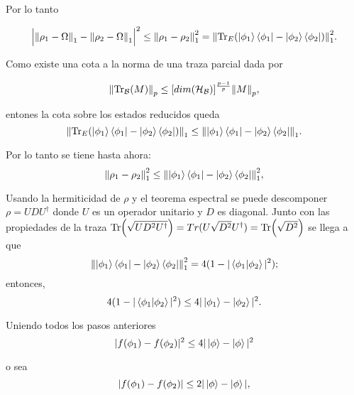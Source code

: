 Por lo tanto 

\begin{equation}
\Big | \norm{\rho_{1}-\Omega}_{1} - \norm{\rho_{2}-\Omega}_{1} \Big |^2 \le \norm{\rho_{1}- \rho_{2} }_{1}^2= \norm{\Tr_{E}(\ket{\phi_{1}} \bra{\phi_{1}}-\ket{\phi_{2}} \bra{\phi_{2}})}_{1}^{2}.
\end{equation}

Como existe una cota a la norma de una traza parcial dada por

\begin{equation}
\norm{\Tr_{\mathcal{B}}(M)}_{p} \le [dim(\mathcal{H_{B}})]^{\frac{p-1}{p}} \norm{M}_{p},
\end{equation}

entones la cota sobre los estados reducidos queda 
\begin{equation}
\norm{\Tr_{E}(\ket{\phi_{1}} \bra{\phi_{1}}-\ket{\phi_{2}} \bra{\phi_{2}})}_{1} \le \norm{\ket{\phi_{1}} \bra{\phi_{1}}-\ket{\phi_{2}} \bra{\phi_{2}}}_{1}.
\end{equation}

Por lo tanto se tiene hasta ahora:
\begin{equation}
\norm{\rho_{1}- \rho_{2} }_{1}^2 \le \norm{\ket{\phi_{1}} \bra{\phi_{1}}-\ket{\phi_{2}} \bra{\phi_{2}}}_{1}^{2},
\end{equation}

Usando la hermiticidad de $\rho$ y el teorema espectral se puede descomponer $\rho= UDU^{\dag}$ donde $U$ es un operador unitario y $D$ es diagonal. Junto con las propiedades de la traza $\Tr(\sqrt{UD^2U^{\dag}})= Tr(U\sqrt{D^2}U^{\dag})= \Tr(\sqrt{D^{2}})$ se llega a que
\begin{equation}
\norm{\ket{\phi_{1}} \bra{\phi_{1}}-\ket{\phi_{2}} \bra{\phi_{2}}}_{1}^{2} = 4(1-|\bra{\phi_{1}} \ket{\phi_{2}}|^{2});
\end{equation}
entonces,
\begin{equation}
 4(1-|\bra{\phi_{1}} \ket{\phi_{2}}|^{2}) \le 4|\ket{\phi_{1}}-\ket{\phi_{2}}|^2.
\end{equation}

Uniendo todos los pasos anteriores
\begin{equation}
|f(\phi_{1})-f(\phi_{2})|^{2} \le  4|\ket{\phi}-\ket{\phi}|^2
\end{equation}

o sea 
\begin{equation}
|f(\phi_{1})-f(\phi_{2})| \le  2|\ket{\phi}-\ket{\phi}|,
\end{equation}

